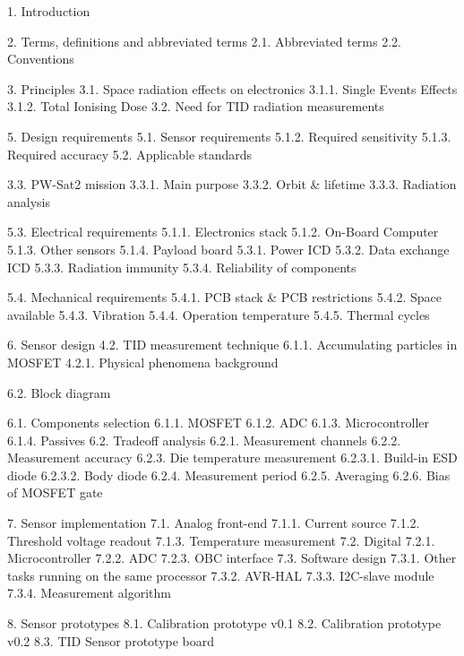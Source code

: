 \documentclass[pdflatex,en]{aghdpl}  %
\author{Marcin Szpyrka}
\date{2011}
\begin{document}
\titlepages

\tableofcontents
\clearpage






1. Introduction

2. Terms, definitions and abbreviated terms 
2.1. Abbreviated terms
2.2. Conventions

3. Principles
3.1. Space radiation effects on electronics
3.1.1. Single Events Effects
3.1.2. Total Ionising Dose
3.2. Need for TID radiation measurements




5. Design requirements
5.1. Sensor requirements
5.1.2. Required sensitivity
5.1.3. Required accuracy
5.2. Applicable standards

3.3. PW-Sat2 mission
3.3.1. Main purpose
3.3.2. Orbit \& lifetime
3.3.3. Radiation analysis

5.3. Electrical requirements
5.1.1. Electronics stack
5.1.2. On-Board Computer
5.1.3. Other sensors
5.1.4. Payload board
5.3.1. Power ICD
5.3.2. Data exchange ICD
5.3.3. Radiation immunity
5.3.4. Reliability of components

5.4. Mechanical requirements
5.4.1. PCB stack \& PCB restrictions
5.4.2. Space available
5.4.3. Vibration
5.4.4. Operation temperature
5.4.5. Thermal cycles





6. Sensor design
4.2. TID measurement technique
6.1.1. Accumulating particles in MOSFET
4.2.1. Physical phenomena background

6.2. Block diagram

6.1. Components selection
6.1.1. MOSFET
6.1.2. ADC
6.1.3. Microcontroller
6.1.4. Passives
6.2. Tradeoff analysis
6.2.1. Measurement channels
6.2.2. Measurement accuracy
6.2.3. Die temperature measurement
6.2.3.1. Build-in ESD diode
6.2.3.2. Body diode
6.2.4. Measurement period
6.2.5. Averaging
6.2.6. Bias of MOSFET gate

7. Sensor implementation
7.1. Analog front-end
7.1.1. Current source
7.1.2. Threshold voltage readout
7.1.3. Temperature measurement
7.2. Digital
7.2.1. Microcontroller
7.2.2. ADC
7.2.3. OBC interface
7.3. Software design
7.3.1. Other tasks running on the same processor
7.3.2. AVR-HAL
7.3.3. I2C-slave module
7.3.4. Measurement algorithm

8. Sensor prototypes
8.1. Calibration prototype v0.1
8.2. Calibration prototype v0.2
8.3. TID Sensor prototype board
\end{document}

